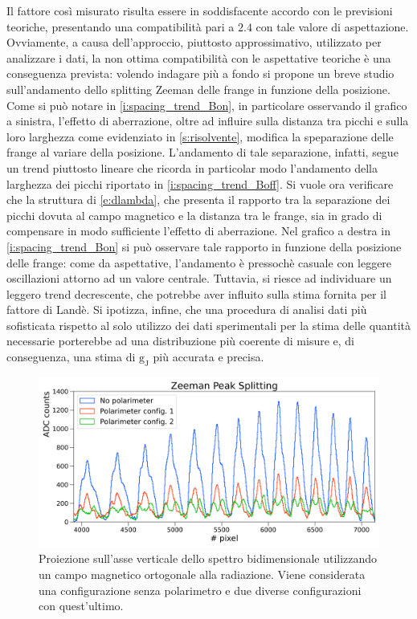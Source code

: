 \documentclass[twocolumn,10pt]{asme2ej}
\begin{document}
\vspace{-5pt}
Il fattore così misurato risulta essere in soddisfacente accordo con le previsioni teoriche, presentando una
compatibilità pari a $2.4$ con tale valore di aspettazione. Ovviamente, a causa dell'approccio, piuttosto
approssimativo, utilizzato per analizzare i dati, la non ottima compatibilità con le aspettative teoriche è una
conseguenza prevista: volendo indagare più a fondo si propone un breve studio sull'andamento dello splitting Zeeman
delle frange in funzione della posizione. Come si può notare in \autoref{i:spacing_trend_Bon}, in particolare osservando
il grafico a sinistra, l'effetto di aberrazione, oltre ad influire sulla distanza tra picchi e sulla loro larghezza come
evidenziato in \autoref{s:risolvente}, modifica la speparazione delle frange al variare della posizione. L'andamento di
tale separazione, infatti, segue un trend piuttosto lineare che ricorda in particolar modo l'andamento della larghezza
dei picchi riportato in \autoref{i:spacing_trend_Boff}. Si vuole ora verificare che la struttura di \autoref{e:dlambda},
che presenta il rapporto tra la separazione dei picchi dovuta al campo magnetico e la distanza tra le frange, sia in
grado di compensare in modo sufficiente l'effetto di aberrazione. Nel grafico a destra in \autoref{i:spacing_trend_Bon}
si può osservare tale rapporto in funzione della posizione delle frange: come da aspettative, l'andamento è pressochè
casuale con leggere oscillazioni attorno ad un valore centrale. Tuttavia, si riesce ad individuare un leggero trend
decrescente, che potrebbe aver influito sulla stima fornita per il fattore di Landè. Si ipotizza, infine, che una
procedura di analisi dati più sofisticata rispetto al solo utilizzo dei dati sperimentali per la stima delle quantità
necessarie porterebbe ad una distribuzione più coerente di misure e, di conseguenza, una stima di $ \text{g}_{\text{J}}$
più accurata e precisa.


\begin{figure}
    \centering
    \includegraphics[width=\linewidth]{../Plots/Bon_overlap_small.png}
    \caption{Proiezione sull'asse verticale dello spettro bidimensionale utilizzando un campo magnetico ortogonale alla
    radiazione. Viene considerata una configurazione senza polarimetro e due diverse configurazioni con quest'ultimo.}
    \label{i:spettro2d_overlap}
    \vspace{-10pt}
\end{figure}
\end{document}
